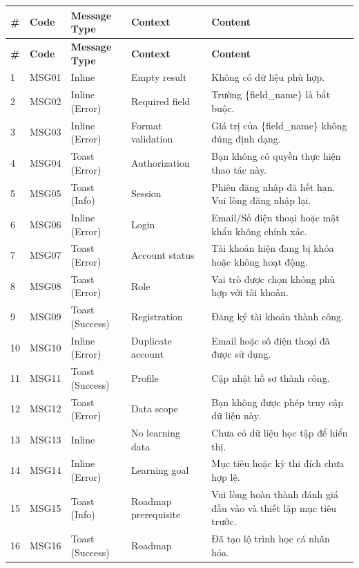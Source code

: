 \documentclass[12pt,a4paper,oneside]{report}
\begin{document}
{\scriptsize
\renewcommand{\arraystretch}{1.2}
\begin{longtable}{|p{0.7cm}|p{1.25cm}|p{2.0cm}|p{2.6cm}|p{6.4cm}|}
\hline
\rowcolor{orange!15}
\textbf{\#} & \textbf{Code} & \textbf{Message Type} & \textbf{Context} & \textbf{Content} \\
\hline
\endfirsthead
\hline
\rowcolor{orange!15}
\textbf{\#} & \textbf{Code} & \textbf{Message Type} & \textbf{Context} & \textbf{Content} \\
\hline
\endhead
1 & MSG01 & Inline & Empty result & Không có dữ liệu phù hợp. \\ \hline
2 & MSG02 & Inline (Error) & Required field & Trường \{field\_name\} là bắt buộc. \\ \hline
3 & MSG03 & Inline (Error) & Format validation & Giá trị của \{field\_name\} không đúng định dạng. \\ \hline
4 & MSG04 & Toast (Error) & Authorization & Bạn không có quyền thực hiện thao tác này. \\ \hline
5 & MSG05 & Toast (Info) & Session & Phiên đăng nhập đã hết hạn. Vui lòng đăng nhập lại. \\ \hline
6 & MSG06 & Inline (Error) & Login & Email/Số điện thoại hoặc mật khẩu không chính xác. \\ \hline
7 & MSG07 & Toast (Error) & Account status & Tài khoản hiện đang bị khóa hoặc không hoạt động. \\ \hline
8 & MSG08 & Toast (Error) & Role & Vai trò được chọn không phù hợp với tài khoản. \\ \hline
9 & MSG09 & Toast (Success) & Registration & Đăng ký tài khoản thành công. \\ \hline
10 & MSG10 & Inline (Error) & Duplicate account & Email hoặc số điện thoại đã được sử dụng. \\ \hline
11 & MSG11 & Toast (Success) & Profile & Cập nhật hồ sơ thành công. \\ \hline
12 & MSG12 & Toast (Error) & Data scope & Bạn không được phép truy cập dữ liệu này. \\ \hline
13 & MSG13 & Inline & No learning data & Chưa có dữ liệu học tập để hiển thị. \\ \hline
14 & MSG14 & Inline (Error) & Learning goal & Mục tiêu hoặc kỳ thi đích chưa hợp lệ. \\ \hline
15 & MSG15 & Toast (Info) & Roadmap prerequisite & Vui lòng hoàn thành đánh giá đầu vào và thiết lập mục tiêu trước. \\ \hline
16 & MSG16 & Toast (Success) & Roadmap & Đã tạo lộ trình học cá nhân hóa. \\ \hline

\end{longtable}}
\end{document}
